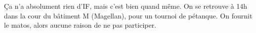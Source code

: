 Ça n'a absolument rien d'IF, mais c'est bien quand même. On se retrouve à 14h
dans la cour du bâtiment M (Magellan), pour un tournoi de pétanque. On fournit
le matos, alors aucune raison de ne pas participer.
